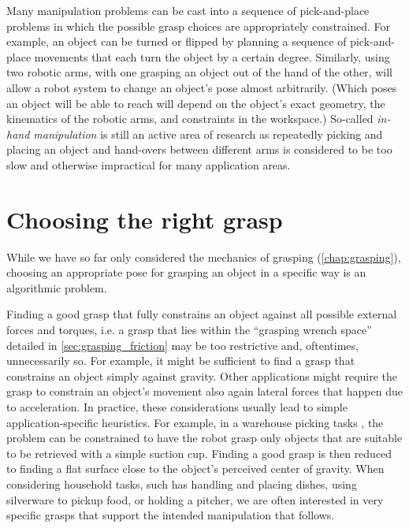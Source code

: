 Many manipulation problems can be cast into a sequence of pick-and-place problems in which the possible grasp choices are appropriately constrained. For example, an object can be turned or flipped by planning a sequence of pick-and-place movements that each turn the object by a certain degree. Similarly, using two robotic arms, with one grasping an object out of the hand of the other, will allow a robot system to change an object's pose almost arbitrarily. (Which poses an object will be able to reach will depend on the object's exact geometry, the kinematics of the robotic arms, and constraints in the workspace.) So-called \textsl{in-hand manipulation} is still an active area of research as repeatedly picking and placing an object and hand-overs between different arms is considered to be too slow and otherwise impractical for many application areas.

\section{Choosing the right grasp}
While we have so far only considered the mechanics of grasping (\cref{chap:grasping}), choosing an appropriate pose for grasping an object in a specific way is an algorithmic problem.

Finding a good grasp that fully constrains an object against all possible external forces and torques, i.e. a grasp that lies within the ``grasping wrench space'' detailed in \cref{sec:grasping_friction} may be too restrictive and, oftentimes, unnecessarily so.
For example, it might be sufficient to find a grasp that constrains an object simply against gravity.
Other applications might require the grasp to constrain an object's movement also again lateral forces that happen due to acceleration.
In practice, these considerations usually lead to simple application-specific heuristics. For example, in a warehouse picking tasks \cite{correll2016analysis}, the problem can be constrained to have the robot grasp only objects that are suitable to be retrieved with a simple suction cup. Finding a good grasp is then reduced to finding a flat surface close to the object's perceived center of gravity.
When considering household tasks, such has handling and placing dishes, using silverware to pickup food, or holding a pitcher, we are often interested in very specific grasps that support the intended manipulation that follows.

